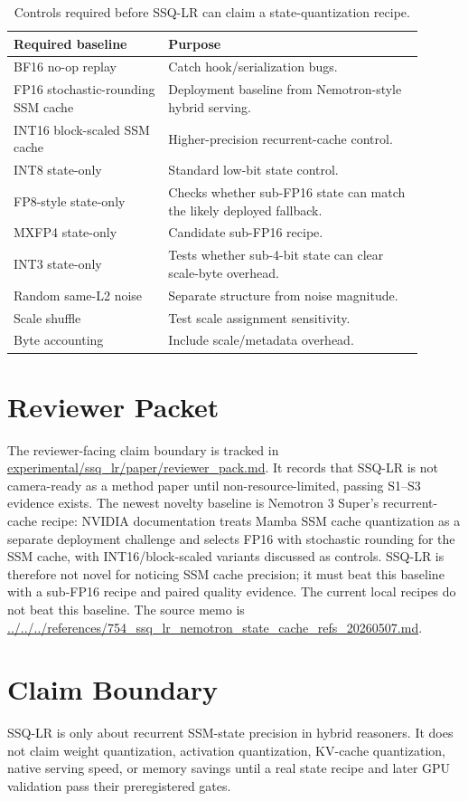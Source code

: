 \documentclass{article}
\begin{document}
\begin{table}[h]
\centering
\small
\begin{tabular}{p{0.34\linewidth}p{0.56\linewidth}}
\toprule
Required baseline & Purpose \\
\midrule
BF16 no-op replay & Catch hook/serialization bugs. \\
FP16 stochastic-rounding SSM cache & Deployment baseline from Nemotron-style hybrid serving. \\
INT16 block-scaled SSM cache & Higher-precision recurrent-cache control. \\
INT8 state-only & Standard low-bit state control. \\
FP8-style state-only & Checks whether sub-FP16 state can match the likely deployed fallback. \\
MXFP4 state-only & Candidate sub-FP16 recipe. \\
INT3 state-only & Tests whether sub-4-bit state can clear scale-byte overhead. \\
Random same-L2 noise & Separate structure from noise magnitude. \\
Scale shuffle & Test scale assignment sensitivity. \\
Byte accounting & Include scale/metadata overhead. \\
\bottomrule
\end{tabular}
\caption{Controls required before SSQ-LR can claim a state-quantization recipe.}
\end{table}

\section{Reviewer Packet}

The reviewer-facing claim boundary is tracked in
\url{experimental/ssq_lr/paper/reviewer_pack.md}. It records that SSQ-LR is
not camera-ready as a method paper until non-resource-limited, passing S1--S3 evidence exists.
The newest novelty baseline is Nemotron 3 Super's recurrent-cache recipe:
NVIDIA documentation treats Mamba SSM cache quantization as a separate
deployment challenge and selects FP16 with stochastic rounding for the SSM cache,
with INT16/block-scaled variants discussed as controls. SSQ-LR is therefore not
novel for noticing SSM cache precision; it must beat this baseline with a
sub-FP16 recipe and paired quality evidence. The current local recipes do not
beat this baseline. The source memo is
\url{../../../references/754_ssq_lr_nemotron_state_cache_refs_20260507.md}.

\section{Claim Boundary}

SSQ-LR is only about recurrent SSM-state precision in hybrid reasoners. It
does not claim weight quantization, activation quantization, KV-cache
quantization, native serving speed, or memory savings until a real state recipe
and later GPU validation pass their preregistered gates.
\end{document}
